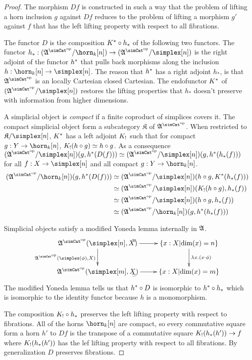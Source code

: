 \newcommand\compact{\mathfrak{K}}
\newcommand\slice[1]{(\ambient\s/#1)}
\begin{proof}
The morphism $Df$ is constructed in such a way that the problem of lifting a horn inclusion $g$ against $Df$ reduces to the problem of lifting a morphism $g'$ against $f$ that has the left lifting property with respect to all fibrations. %


The functor $D$ is the composition $K^*\circ h_*$ of the following two functors. The functor $h_*\of\slice{\horn_k[n]}\to\slice{\simplex[n]}$ is the right adjoint of the functor $h^*$ that pulls back morphisms along the inclusion $h\of\horn_k[n]\to\simplex[n]$. The reason that $h^*$ has a right adjoint $h_*$, is that $\ambient\s$ is an locally Cartesian closed Cartesian. The endofunctor $K^*$ of $\slice{\simplex[n]}$ restores the lifting properties that $h_*$ doesn't preserve with information from higher dimensions. %

A simplicial object is \emph{compact} if a finite coproduct of simplices covers it. 
The compact simplicial object form a subcategory $\compact$ of $\ambient\s$. When restricted to $\compact/\simplex[n]$, $K^*$ has a left adjoint $K_!$ such that for compact $g\of Y\to \horn_k[n]$, $K_!(h\circ g)\simeq h\circ g$.%
As a consequence $\slice{\simplex[n]}(g,h\ri(D(f)))\simeq \slice{\simplex[n]}(g,h\ri(h_*(f)))$ for all $f\of X\to\simplex[n]$ and all compact $g\of Y\to \horn_k[n]$.
\begin{align*}
\slice{\horn_k[n]}(g,h\ri(D(f)))&\simeq\slice{\simplex[n]}(h\circ g,K\ri(h_*(f)))\\
&\simeq \slice{\simplex[n]}(K_\bang(h\circ g),h_*(f)) \\
&\simeq \slice{\simplex[n]}(h\circ g,h_*(f)) \\
&\simeq \slice{\horn_k[n]}(g,h\ri(h_*(f)))
\end{align*}

Simplicial objects satisfy a modified Yoneda lemma internally in $\mathfrak A$.
\[\xymatrix{
\ambient\s(\simplex[n],X) \ar[r]^(.4)\simeq \ar[d]_{\ambient\s(\simplex(\phi),X)} & \set{x\of X\middle|\dim(x)=n}\ar[d]^{\lambda x. (x\cdot\phi)}\\
\ambient\s(\simplex[m],X)\ar[r]_(.4)\simeq & \set{x\of X\middle|\dim(x)=m}
}\]
The modified Yoneda lemma tells us that $h^*\circ D$ is isomorphic to $h^*\circ h_*$ which is isomorphic to the identity functor because $h$ is a monomorphism.

The composition $K_!\circ h_*$ preserves the left lifting property with respect to fibrations. %
All of the horns $\horn_k[n]$ are compact, so every commutative square form a horn $h'$ to $Df$ is the transpose of a commutative square $K_!(h_*(h'))\to f$ where $K_!(h_*(h'))$ has the lef lifting property with respect to all fibrations. By generalization $D$ preserves fibrations. 
\end{proof}


